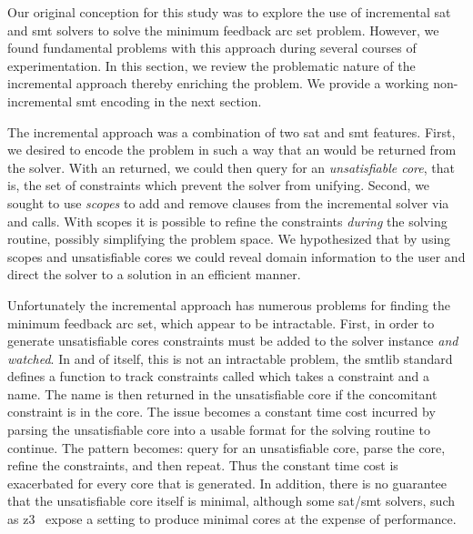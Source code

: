 \label{section:incremental}

Our original conception for this study was to explore the use of incremental
\ac{sat} and \ac{smt} solvers to solve the minimum feedback arc set problem.
However, we found fundamental problems with this approach during several courses
of experimentation. In this section, we review the problematic nature of the
incremental approach thereby enriching the problem. We provide a working
non-incremental \ac{smt} encoding in the next section.

The incremental approach was a combination of two \ac{sat} and \ac{smt}
features. First, we desired to encode the problem in such a way that an
 would be returned from the solver. With an  returned, we
could then query for an \emph{unsatisfiable core}, that is, the set of
constraints which prevent the solver from unifying. Second, we sought to use
\emph{scopes} to add and remove clauses from the incremental solver via
 and  calls. With scopes it is possible to refine the
constraints \emph{during} the solving routine, possibly simplifying the problem
space. We hypothesized that by using scopes and unsatisfiable cores we could
reveal domain information to the user and direct the solver to a solution in an
efficient manner.

Unfortunately the incremental approach has numerous problems for finding the
minimum feedback arc set, which appear to be intractable. First, in order to
generate unsatisfiable cores constraints must be added to the solver instance
\emph{and watched}. In and of itself, this is not an intractable problem, the
\acl{smtlib} standard defines a function to track constraints called
 which takes a constraint and a name. The name is then
returned in the unsatisfiable core if the concomitant constraint is in the core.
The issue becomes a constant time cost incurred by parsing the unsatisfiable
core into a usable format for the solving routine to continue. The pattern
becomes: query for an unsatisfiable core, parse the core, refine the
constraints, and then repeat. Thus the constant time cost is exacerbated for
every core that is generated. In addition, there is no guarantee that the
unsatisfiable core itself is minimal, although some \ac{sat}/\ac{smt} solvers,
such as z3~\cite{10.1007/978-3-540-78800-3_24} expose a setting to produce
minimal cores at the expense of performance.

